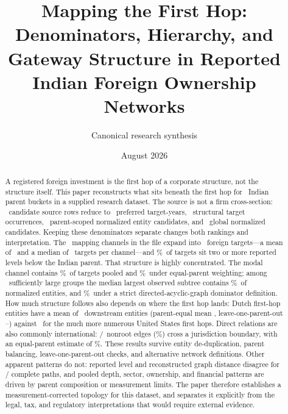 \documentclass[11pt]{article}
\title{\textbf{Mapping the First Hop: Denominators, Hierarchy, and Gateway
Structure in Reported Indian Foreign Ownership Networks}}
\author{Canonical research synthesis}
\date{August 2026}
\newcommand{\pct}{\%}
\begin{document}
\maketitle

\begin{abstract}
A registered foreign investment is the first hop of a corporate structure, not
the structure itself. This paper reconstructs what sits beneath the first hop
for \Parents\ Indian parent buckets in a supplied research dataset. The source
is not a firm cross-section: \RawRows\ candidate source rows reduce to
\PreferredRows\ preferred target-years, \Targets\ structural target
occurrences, \ParentEntities\ parent-scoped normalized entity candidates, and
\GlobalEntities\ global normalized candidates. Keeping these denominators
separate changes both rankings and interpretation. The \UINs\ mapping channels
in the file expand into \Targets\ foreign targets---a mean of
\TargetsPerUinMean\ and a median of \TargetsPerUinMedian\ targets per
channel---and \DepthTwoPlusPct\pct\ of targets sit two or more reported levels
below the Indian parent. That structure is highly concentrated. The modal
channel contains \ModalUinPct\pct\ of targets pooled and \ModalUinEqualPct\pct\
under equal-parent weighting; among \ConcentrationParents\ sufficiently large
groups the median largest observed subtree contains
\ObservedSubtreeMedian\pct\ of normalized entities, and
\DagDominatorMedian\pct\ under a strict directed-acyclic-graph dominator
definition. How much structure follows also depends on where the first hop
lands: Dutch first-hop entities have a mean of \DutchGatewayMean\ downstream
entities (parent-equal mean \DutchGatewayEqualMean, leave-one-parent-out
\DutchGatewayLooLow--\DutchGatewayLooHigh) against \DutchGatewayUsMean\ for the
much more numerous United States first hops. Direct relations are also commonly
international: \CrossBorderEdges/\NonrootEdges\ nonroot edges
(\CrossBorderPct\pct) cross a jurisdiction boundary, with an equal-parent
estimate of \CrossBorderEqualPct\pct. These results survive entity
de-duplication, parent balancing, leave-one-parent-out checks, and alternative
network definitions. Other apparent patterns do not: reported level and
reconstructed graph distance disagree for \DepthMismatchCount/\CompletePaths
complete paths, and pooled depth, sector, ownership, and financial patterns are
driven by parent composition or measurement limits. The paper therefore
establishes a measurement-corrected topology for this dataset, and separates it
explicitly from the legal, tax, and regulatory interpretations that would
require external evidence.
\end{abstract}
\end{document}
